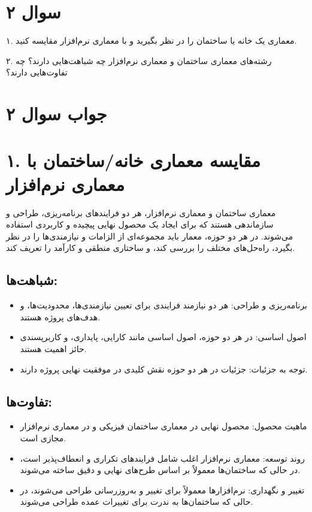 \section*{سوال ۲}

۱. معماری یک خانه یا ساختمان را در نظر بگیرید و با معماری نرم‌افزار مقایسه کنید.

۲. رشته‌های معماری ساختمان و معماری نرم‌افزار چه شباهت‌هایی دارند؟ چه تفاوت‌هایی دارند؟

\section*{جواب سوال ۲}

\section*{۱. مقایسه معماری خانه/ساختمان با معماری نرم‌افزار}
معماری ساختمان و معماری نرم‌افزار، هر دو فرایندهای برنامه‌ریزی، طراحی و سازماندهی هستند که برای ایجاد یک محصول نهایی پیچیده و کاربردی استفاده می‌شوند. در هر دو حوزه، معمار باید مجموعه‌ای از الزامات و نیازمندی‌ها را در نظر بگیرد، راه‌حل‌های مختلف را بررسی کند، و ساختاری منطقی و کارآمد را تعریف کند.

\subsection*{شباهت‌ها:}
\begin{itemize}
	\item برنامه‌ریزی و طراحی: هر دو نیازمند فرایندی برای تعیین نیازمندی‌ها، محدودیت‌ها، و هدف‌های پروژه هستند.
	\item اصول اساسی: در هر دو حوزه، اصول اساسی مانند کارایی، پایداری، و کاربرپسندی حائز اهمیت هستند.
	\item توجه به جزئیات: جزئیات در هر دو حوزه نقش کلیدی در موفقیت نهایی پروژه دارند.
\end{itemize}

\subsection*{تفاوت‌ها:}
\begin{itemize}
	\item ماهیت محصول: محصول نهایی در معماری ساختمان فیزیکی و در معماری نرم‌افزار مجازی است.
	\item روند توسعه: معماری نرم‌افزار اغلب شامل فرایندهای تکراری و انعطاف‌پذیر است، در حالی که ساختمان‌ها معمولاً بر اساس طرح‌های نهایی و دقیق ساخته می‌شوند.
	\item تغییر و نگهداری: نرم‌افزارها معمولاً برای تغییر و به‌روزرسانی طراحی می‌شوند، در حالی که ساختمان‌ها به ندرت برای تغییرات عمده طراحی می‌شوند.
\end{itemize}

